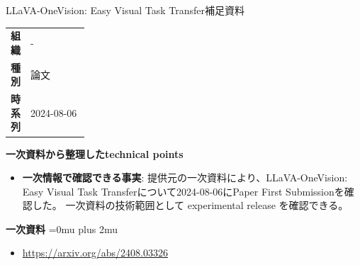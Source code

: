 \begin{technicalnote}{LLaVA-OneVision: Easy Visual Task Transfer}{補足資料}
\begingroup
\begin{tabularx}{\linewidth}{@{}>{\bfseries}p{0.22\linewidth}X@{}}
組織 & - \\
種別 & 論文 \\
時系列 & 2024-08-06 \\
\end{tabularx}
\smallskip
{\bfseries 一次資料から整理したtechnical points}
\begin{itemize}[leftmargin=1.5em,itemsep=0.35em]
\item \textbf{一次情報で確認できる事実}: 提供元の一次資料により、LLaVA-OneVision: Easy Visual Task Transferについて2024-08-06にPaper First Submissionを確認した。 一次資料の技術範囲として experimental release を確認できる。
\end{itemize}
\begin{minipage}{\linewidth}
\begin{samepage}
{\bfseries 一次資料}
\begingroup\sloppy
\Urlmuskip=0mu plus 2mu\relax
\begin{itemize}[leftmargin=1.5em,itemsep=0.25em]
\item {\scriptsize\url{https://arxiv.org/abs/2408.03326}}
\end{itemize}
\endgroup
\end{samepage}
\end{minipage}
\endgroup
\end{technicalnote}
\medskip

